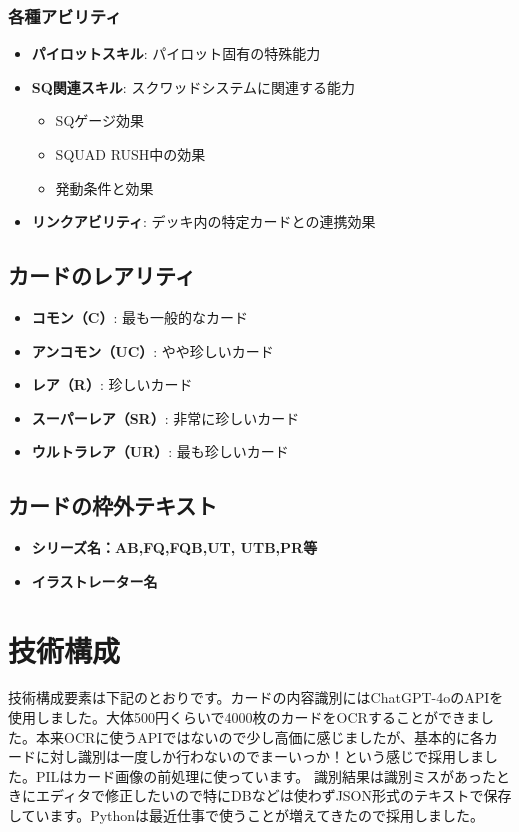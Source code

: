 \subsubsection*{各種アビリティ}
\begin{itemize}
    \item \textbf{パイロットスキル}: パイロット固有の特殊能力
    \item \textbf{SQ関連スキル}: スクワッドシステムに関連する能力
    \begin{itemize}
        \item SQゲージ効果
        \item SQUAD RUSH中の効果
        \item 発動条件と効果
    \end{itemize}
    \item \textbf{リンクアビリティ}: デッキ内の特定カードとの連携効果
\end{itemize}

\subsection*{カードのレアリティ}
\begin{itemize}
    \item \textbf{コモン（C）}: 最も一般的なカード
    \item \textbf{アンコモン（UC）}: やや珍しいカード
    \item \textbf{レア（R）}: 珍しいカード
    \item \textbf{スーパーレア（SR）}: 非常に珍しいカード
    \item \textbf{ウルトラレア（UR）}: 最も珍しいカード
\end{itemize}

\subsection*{カードの枠外テキスト}
\begin{itemize}
\item \textbf{シリーズ名：AB,FQ,FQB,UT, UTB,PR等} 
\item \textbf{イラストレーター名}
\end{itemize}

\section*{技術構成}
技術構成要素は下記のとおりです。カードの内容識別にはChatGPT-4oのAPIを使用しました。大体500円くらいで4000枚のカードをOCRすることができました。本来OCRに使うAPIではないので少し高価に感じましたが、基本的に各カードに対し識別は一度しか行わないのでまーいっか！という感じで採用しました。PILはカード画像の前処理に使っています。
識別結果は識別ミスがあったときにエディタで修正したいので特にDBなどは使わずJSON形式のテキストで保存しています。Pythonは最近仕事で使うことが増えてきたので採用しました。


